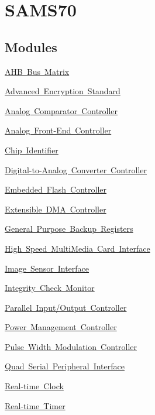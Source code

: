 \hypertarget{group__RTEMSBSPsARMAtsamContribS70}{}\section{S\+A\+M\+S70}
\label{group__RTEMSBSPsARMAtsamContribS70}
\subsection*{Modules}
\begin{DoxyCompactItemize}
\item 
\mbox{\hyperlink{group__SAMS70__MATRIX}{A\+H\+B Bus Matrix}}
\item 
\mbox{\hyperlink{group__SAMS70__AES}{Advanced Encryption Standard}}
\item 
\mbox{\hyperlink{group__SAMS70__ACC}{Analog Comparator Controller}}
\item 
\mbox{\hyperlink{group__SAMS70__AFEC}{Analog Front-\/\+End Controller}}
\item 
\mbox{\hyperlink{group__SAMS70__CHIPID}{Chip Identifier}}
\item 
\mbox{\hyperlink{group__SAMS70__DACC}{Digital-\/to-\/\+Analog Converter Controller}}
\item 
\mbox{\hyperlink{group__SAMS70__EFC}{Embedded Flash Controller}}
\item 
\mbox{\hyperlink{group__SAMS70__XDMAC}{Extensible D\+M\+A Controller}}
\item 
\mbox{\hyperlink{group__SAMS70__GPBR}{General Purpose Backup Registers}}
\item 
\mbox{\hyperlink{group__SAMS70__HSMCI}{High Speed Multi\+Media Card Interface}}
\item 
\mbox{\hyperlink{group__SAMS70__ISI}{Image Sensor Interface}}
\item 
\mbox{\hyperlink{group__SAMS70__ICM}{Integrity Check Monitor}}
\item 
\mbox{\hyperlink{group__SAMS70__PIO}{Parallel Input/\+Output Controller}}
\item 
\mbox{\hyperlink{group__SAMS70__PMC}{Power Management Controller}}
\item 
\mbox{\hyperlink{group__SAMS70__PWM}{Pulse Width Modulation Controller}}
\item 
\mbox{\hyperlink{group__SAMS70__QSPI}{Quad Serial Peripheral Interface}}
\item 
\mbox{\hyperlink{group__SAMS70__RTC}{Real-\/time Clock}}
\item 
\mbox{\hyperlink{group__SAMS70__RTT}{Real-\/time Timer}}

\end{DoxyCompactItemize}
